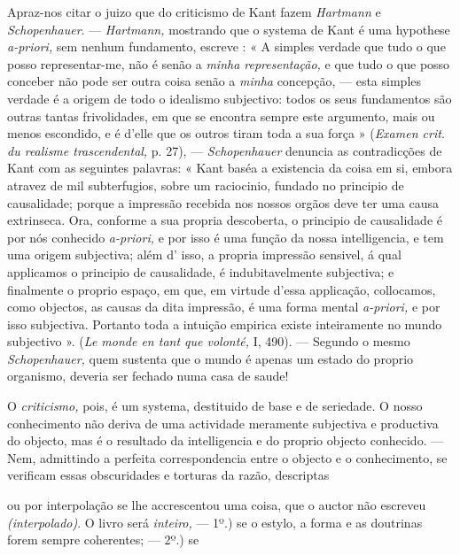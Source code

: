 Apraz-nos citar o juizo que do criticismo de Kant fazem \emph{Hartmann} e \emph{Schopenhauer}. --- \emph{Hartmann,} mostrando que o systema de Kant é uma hypothese \emph{a-priori,} sem nenhum fundamento, escreve : « A simples verdade que tudo o que posso representar-me, não é senão a \emph{minha representação,} e que tudo o que posso conceber não pode ser outra coisa senão a \emph{minha} concepção, --- esta simples verdade é a origem de todo o idealismo subjectivo: todos os seus fundamentos são outras tantas frivolidades, em que se encontra sempre este argumento, mais ou menos escondido, e é d'elle que os outros tiram toda a sua força » (\emph{Examen crit. du realisme trascendental,} p. 27), --- \emph{Schopenhauer} denuncia as contradicções de Kant com as seguintes palavras: « Kant baséa a existencia da coisa em si, embora atravez de mil subterfugios, sobre um raciocinio, fundado no principio de causalidade; porque a impressão recebida nos nossos orgãos deve ter uma causa extrinseca. Ora, conforme a sua propria descoberta, o principio de causalidade é por nós conhecido \emph{a-priori,} e por isso é uma função da nossa intelligencia, e tem uma origem subjectiva; além d' isso, a propria impressão sensivel, á qual applicamos o principio de causalidade, é indubitavelmente subjectiva; e finalmente o proprio espaço, em que, em virtude d'essa applicação, collocamos, como objectos, as causas da dita impressão, é uma forma mental \emph{a-priori,} e por isso subjectiva. Portanto toda a intuição empirica existe inteiramente no mundo subjectivo ». (\emph{Le monde en tant que volonté,} I, 490). --- Segundo o mesmo \emph{Schopenhauer,} quem sustenta que o mundo é apenas um estado do proprio organismo, deveria ser fechado numa casa de saude!

O \emph{criticismo,} pois, é um systema, destituido de base e de seriedade. O nosso conhecimento não deriva de uma actividade meramente subjectiva e productiva do objecto, mas é o resultado da intelligencia e do proprio objecto conhecido. --- Nem, admittindo a perfeita correspondencia entre o objecto e o conhecimento, se verificam essas obscuridades e torturas da razão, descriptas

ou por interpolação se lhe accrescentou uma coisa, que o auctor não escreveu \emph{(interpolado)}. O livro será \emph{inteiro,} --- 1º.) se o estylo, a forma e as doutrinas forem sempre coherentes; --- 2º.) se

